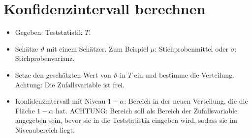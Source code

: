 \section{Konfidenzintervall berechnen}

\begin{itemize}
	\item Gegeben: Teststatistik $T$.
	\item Schätze $\vartheta$ mit einem Schätzer. Zum Beispiel $\mu$: Stichprobenmittel oder $\sigma$: Stichprobenvarianz.
	\item Setze den geschätzten Wert von $\vartheta$ in $T$ ein und bestimme die Verteilung. Achtung: Die Zufallsvariable ist frei. 
	\item Konfidenzintervall mit Niveau $1-\alpha$: Bereich in der neuen Verteilung, die die Fläche $1-\alpha$ hat. ACHTUNG: Bereich soll als Bereich der Zufallsvariable angegeben sein, bevor sie in die Teststatistik eingeben wird, sodass sie im Niveaubereich liegt.
\end{itemize}












































